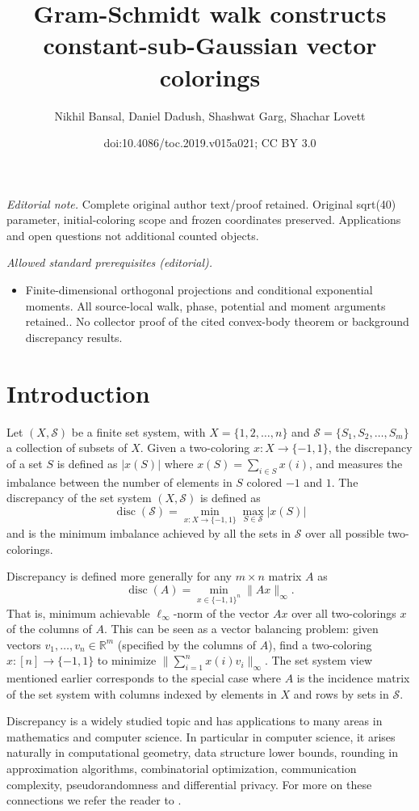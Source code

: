 \documentclass[11pt]{article}
\title{Gram-Schmidt walk constructs constant-sub-Gaussian vector colorings}
\author{Nikhil Bansal, Daniel Dadush, Shashwat Garg, Shachar Lovett}
\date{doi:10.4086/toc.2019.v015a021; CC BY 3.0}
\numberwithin{equation}{section}
\theoremstyle{definition}
\theoremstyle{plain}
\DeclareMathOperator{\disc}{disc}   %
\begin{document}
\maketitle
\noindent\textit{Editorial note.} Complete original author text/proof retained. Original sqrt(40) parameter, initial-coloring scope and frozen coordinates preserved. Applications and open questions not additional counted objects.\par\medskip
\noindent\textit{Allowed standard prerequisites (editorial).}\begin{itemize}
\item Finite-dimensional orthogonal projections and conditional exponential moments. All source-local walk, phase, potential and moment arguments retained.. No collector proof of the cited convex-body theorem or background discrepancy results.
\end{itemize}\medskip
\section{Introduction}
Let $(X,\mathcal{S})$ be a finite set system, with $X=\{1,2,\dots,n\}$ and $\mathcal{S}=\{S_1,S_2,\dots,S_m\}$ a collection of subsets of $X$. Given a two-coloring $x:X\rightarrow \{-1,1\}$, the discrepancy of a set $S$ is defined as $|x(S)|$ where $x(S) = \sum_{i\in S} x(i)$, and measures the imbalance between the number of elements in $S$ colored $-1$ and $1$. The discrepancy of the set system $(X,\mathcal{S})$ is defined as
\[ \disc(\mathcal{S}) = \min_{x:X\rightarrow \{-1,1\}} \max_{S\in\mathcal{S}} |x(S)| \]
and is the minimum imbalance achieved by all the sets in $\mathcal{S}$ over all possible two-colorings.

Discrepancy is defined more generally for any $m\times n$ matrix $A$ as
\[ \disc(A) = \min_{x\in\{- 1,1\}^n} \| Ax\|_{\infty}.\]
That is, minimum achievable $\ell_{\infty}$-norm of the vector $Ax$ over all two-colorings $x$ of the columns of $A$. This can be seen as a vector balancing problem: given vectors $v_1,\dots,v_n \in\mathbb{R}^m$ (specified by the columns of $A$), find a two-coloring $x: [n]\rightarrow \{-1,1\}$ to minimize $\| \sum_{i=1}^n x(i) v_i \|_{\infty}$. The set system view mentioned earlier corresponds to the special case where $A$ is the incidence matrix of the set system with columns indexed by elements in $X$ and rows by sets in $\mathcal{S}$.

Discrepancy is a widely studied topic and has applications to many areas in mathematics and computer science.
In particular in computer science, it arises naturally in computational geometry, data structure lower bounds, rounding in approximation algorithms, combinatorial optimization, communication complexity, pseudorandomness and differential privacy. For more on these connections we refer the reader to \cite{Chazelle,Mat09,Sashothesis}.
\end{document}
